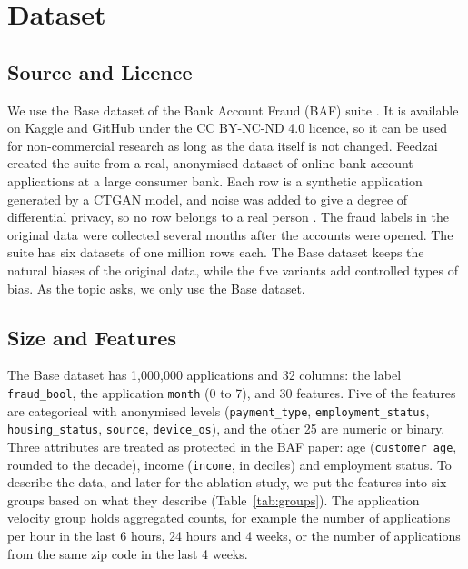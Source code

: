 \section{Dataset}
\label{sec:dataset}

\subsection{Source and Licence}

We use the Base dataset of the Bank Account Fraud (BAF) suite \cite{jesus2022turning}. It is
available on Kaggle and GitHub \cite{baf2022kaggle} under the CC BY-NC-ND 4.0 licence, so it can be
used for non-commercial research as long as the data itself is not changed. Feedzai created the
suite from a real, anonymised dataset of online bank account applications at a large consumer bank.
Each row is a synthetic application generated by a CTGAN model, and noise was added to give a degree
of differential privacy, so no row belongs to a real person \cite{jesus2022turning}. The fraud labels
in the original data were collected several months after the accounts were opened. The suite has six
datasets of one million rows each. The Base dataset keeps the natural biases of the original data,
while the five variants add controlled types of bias. As the topic asks, we only use the Base
dataset.

\subsection{Size and Features}

The Base dataset has 1{,}000{,}000 applications and 32 columns: the label \texttt{fraud\_bool}, the
application \texttt{month} (0 to 7), and 30 features. Five of the features are categorical with
anonymised levels (\texttt{payment\_type}, \texttt{employment\_status}, \texttt{housing\_status},
\texttt{source}, \texttt{device\_os}), and the other 25 are numeric or binary. Three attributes are
treated as protected in the BAF paper: age (\texttt{customer\_age}, rounded to the decade), income
(\texttt{income}, in deciles) and employment status. To describe the data, and later for the
ablation study, we put the features into six groups based on what they describe
(Table~\ref{tab:groups}). The application velocity group holds aggregated counts, for example the
number of applications per hour in the last 6 hours, 24 hours and 4 weeks, or the number of
applications from the same zip code in the last 4 weeks.

